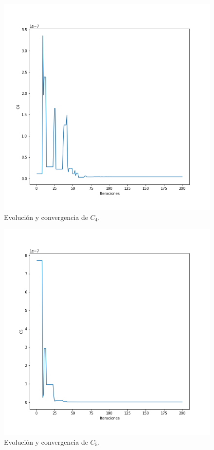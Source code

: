 \documentclass{llncs}
\begin{document}
	\begin{figure}[H]
		\includegraphics[width=\linewidth]{ContinuoLibre/C4.png}
		\caption{Evolución y convergencia de $C_4$.}
		\label{fig:C4ContinuoLibre}
	\end{figure}

	\begin{figure}[H]
		\includegraphics[width=\linewidth]{ContinuoLibre/C5.png}
		\caption{Evolución y convergencia de $C_5$.}
		\label{fig:C5ContinuoLibre}
	\end{figure}
\end{document}
